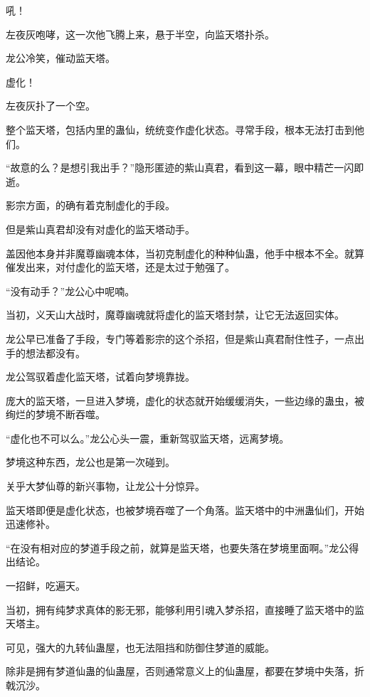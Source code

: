 
\begin{this_body}



吼！

左夜灰咆哮，这一次他飞腾上来，悬于半空，向监天塔扑杀。

龙公冷笑，催动监天塔。

虚化！

左夜灰扑了一个空。

整个监天塔，包括内里的蛊仙，统统变作虚化状态。寻常手段，根本无法打击到他们。

“故意的么？是想引我出手？”隐形匿迹的紫山真君，看到这一幕，眼中精芒一闪即逝。

影宗方面，的确有着克制虚化的手段。

但是紫山真君却没有对虚化的监天塔动手。

盖因他本身并非魔尊幽魂本体，当初克制虚化的种种仙蛊，他手中根本不全。就算催发出来，对付虚化的监天塔，还是太过于勉强了。

“没有动手？”龙公心中呢喃。

当初，义天山大战时，魔尊幽魂就将虚化的监天塔封禁，让它无法返回实体。

龙公早已准备了手段，专门等着影宗的这个杀招，但是紫山真君耐住性子，一点出手的想法都没有。

龙公驾驭着虚化监天塔，试着向梦境靠拢。

庞大的监天塔，一旦进入梦境，虚化的状态就开始缓缓消失，一些边缘的蛊虫，被绚烂的梦境不断吞噬。

“虚化也不可以么。”龙公心头一震，重新驾驭监天塔，远离梦境。

梦境这种东西，龙公也是第一次碰到。

关乎大梦仙尊的新兴事物，让龙公十分惊异。

监天塔即便是虚化状态，也被梦境吞噬了一个角落。监天塔中的中洲蛊仙们，开始迅速修补。

“在没有相对应的梦道手段之前，就算是监天塔，也要失落在梦境里面啊。”龙公得出结论。

一招鲜，吃遍天。

当初，拥有纯梦求真体的影无邪，能够利用引魂入梦杀招，直接睡了监天塔中的监天塔主。

可见，强大的九转仙蛊屋，也无法阻挡和防御住梦道的威能。

除非是拥有梦道仙蛊的仙蛊屋，否则通常意义上的仙蛊屋，都要在梦境中失落，折戟沉沙。


\end{this_body}
